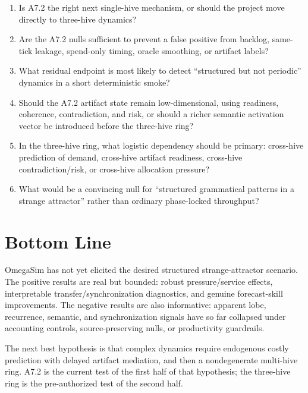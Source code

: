 \documentclass[11pt]{article}
\begin{document}
\begin{enumerate}
\item Is A7.2 the right next single-hive mechanism, or should the project move
directly to three-hive dynamics?
\item Are the A7.2 nulls sufficient to prevent a false positive from backlog,
same-tick leakage, spend-only timing, oracle smoothing, or artifact labels?
\item What residual endpoint is most likely to detect ``structured but not
periodic'' dynamics in a short deterministic smoke?
\item Should the A7.2 artifact state remain low-dimensional, using readiness,
coherence, contradiction, and risk, or should a richer semantic activation
vector be introduced before the three-hive ring?
\item In the three-hive ring, what logistic dependency should be primary:
cross-hive prediction of demand, cross-hive artifact readiness, cross-hive
contradiction/risk, or cross-hive allocation pressure?
\item What would be a convincing null for ``structured grammatical patterns in
a strange attractor'' rather than ordinary phase-locked throughput?
\end{enumerate}

\section{Bottom Line}

OmegaSim has not yet elicited the desired structured strange-attractor
scenario. The positive results are real but bounded: robust pressure/service
effects, interpretable transfer/synchronization diagnostics, and genuine
forecast-skill improvements. The negative results are also informative:
apparent lobe, recurrence, semantic, and synchronization signals have so far
collapsed under accounting controls, source-preserving nulls, or productivity
guardrails.

The next best hypothesis is that complex dynamics require endogenous costly
prediction with delayed artifact mediation, and then a nondegenerate multi-hive
ring. A7.2 is the current test of the first half of that hypothesis; the
three-hive ring is the pre-authorized test of the second half.
\end{document}
